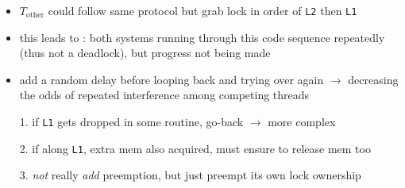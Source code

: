 \begin{itemize}
\item $T_{\text{other}}$ could follow same protocol but grab lock in order of \texttt{L2} then \texttt{L1}
\item this leads to : both systems running through this code sequence repeatedly (thus not a deadlock), but progress not being made
\item add a random delay before looping back and trying over again $\to$ decreasing the odds of repeated interference among competing threads
\item[1.] if \texttt{L1} gets dropped in some routine, go-back $\to$ more complex
\item[2.] if along \texttt{L1}, extra mem also acquired, must ensure to release mem too
\item[3.] \emph{not} really \emph{add} preemption, but just preempt its own lock ownership
\end{itemize}
